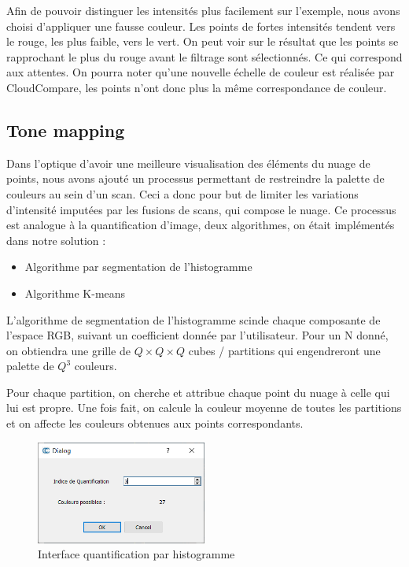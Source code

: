 \documentclass[12pt,titlepage,french]{article}
\begin{document}
Afin de pouvoir distinguer les intensités plus facilement sur l'exemple, nous avons choisi d'appliquer une fausse couleur. Les points de fortes intensités tendent vers le rouge, les plus faible, vers le vert. On peut voir sur le résultat que les points se rapprochant le plus du rouge avant le filtrage sont sélectionnés. Ce qui correspond aux attentes. On pourra noter qu'une nouvelle échelle de couleur est réalisée par CloudCompare, les points n'ont donc plus la même correspondance de couleur.

\subsection{Tone mapping}

Dans l'optique d'avoir une meilleure visualisation des éléments du nuage de points, nous avons ajouté un processus permettant de restreindre la palette de couleurs au sein d'un scan. Ceci a donc pour but de limiter les variations d'intensité imputées par les fusions de scans, qui compose le nuage. Ce processus est analogue à la quantification d'image, deux algorithmes, on était implémentés dans notre solution :

\begin{itemize}
    \item Algorithme par segmentation de l'histogramme
    \item Algorithme K-means
\end{itemize}

L'algorithme de segmentation de l'histogramme scinde chaque composante de l'espace RGB, suivant un coefficient donnée par l'utilisateur.
Pour un N donné, on obtiendra une grille de $Q\times Q \times Q$ cubes / partitions qui engendreront une palette de $Q^3$ couleurs.
\newline

Pour chaque partition, on cherche et attribue chaque point du nuage à celle qui lui est propre. Une fois fait,
on calcule la couleur moyenne de toutes les partitions et on affecte les couleurs obtenues aux points correspondants.
\newline

 \begin{figure}[H]
\center
\includegraphics[width=0.5\textwidth]{./img/HistogramDialog.png}
\caption{\label{} Interface quantification par histogramme}
\end{figure}
\end{document}
